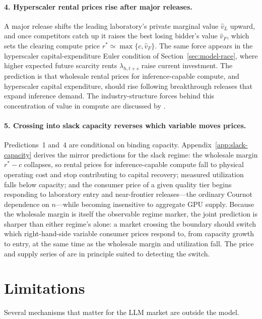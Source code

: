\documentclass[11pt]{article}
\begin{document}
\paragraph{4. Hyperscaler rental prices rise after major releases.} A major release shifts the leading laboratory's private marginal value $\widehat v_L$ upward, and once competitors catch up it raises the best losing bidder's value $\widehat v_F$, which sets the clearing compute price $r^*\simeq\max\{c,\widehat v_F\}$. The same force appears in the hyperscaler capital-expenditure Euler condition of Section~\ref{sec:model-race}, where higher expected future scarcity rents $\lambda_{h,t+s}$ raise current investment. The prediction is that wholesale rental prices for inference-capable compute, and hyperscaler capital expenditure, should rise following breakthrough releases that expand inference demand. The industry-structure forces behind this concentration of value in compute are discussed by \citet{korinekVipra2025}.

\paragraph{5. Crossing into slack capacity reverses which variable moves prices.} Predictions~1 and~4 are conditional on binding capacity. Appendix~\ref{app:slack-capacity} derives the mirror predictions for the slack regime: the wholesale margin $r^{*}-c$ collapses, so rental prices for inference-capable compute fall to physical operating cost and stop contributing to capital recovery; measured utilization falls below capacity; and the consumer price of a given quality tier begins responding to laboratory entry and near-frontier releases---the ordinary Cournot dependence on $n$---while becoming insensitive to aggregate GPU supply. Because the wholesale margin is itself the observable regime marker, the joint prediction is sharper than either regime's alone: a market crossing the boundary should switch which right-hand-side variable consumer prices respond to, from capacity growth to entry, at the same time as the wholesale margin and utilization fall. The price and supply series of \citet{demirerEtAl2025} are in principle suited to detecting the switch.

\section{Limitations}
\label{sec:limitations}

Several mechanisms that matter for the LLM market are outside the model.
\end{document}
